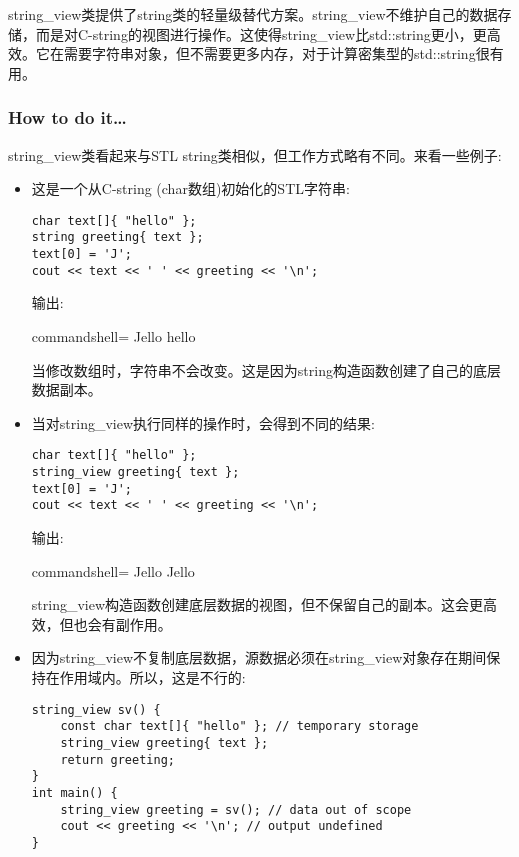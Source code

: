 
string\_view类提供了string类的轻量级替代方案。string\_view不维护自己的数据存储，而是对C-string的视图进行操作。这使得string\_view比std::string更小，更高效。它在需要字符串对象，但不需要更多内存，对于计算密集型的std::string很有用。

\subsubsection{How to do it…}

string\_view类看起来与STL string类相似，但工作方式略有不同。来看一些例子:

\begin{itemize}
\item 
这是一个从C-string (char数组)初始化的STL字符串:

\begin{lstlisting}[style=styleCXX]
char text[]{ "hello" };
string greeting{ text };
text[0] = 'J';
cout << text << ' ' << greeting << '\n';
\end{lstlisting}

输出:

\begin{tcblisting}{commandshell={}}
Jello hello
\end{tcblisting}

当修改数组时，字符串不会改变。这是因为string构造函数创建了自己的底层数据副本。

\item 
当对string\_view执行同样的操作时，会得到不同的结果:

\begin{lstlisting}[style=styleCXX]
char text[]{ "hello" };
string_view greeting{ text };
text[0] = 'J';
cout << text << ' ' << greeting << '\n';
\end{lstlisting}

输出:

\begin{tcblisting}{commandshell={}}
Jello Jello
\end{tcblisting}

string\_view构造函数创建底层数据的视图，但不保留自己的副本。这会更高效，但也会有副作用。

\item 
因为string\_view不复制底层数据，源数据必须在string\_view对象存在期间保持在作用域内。所以，这是不行的:

\begin{lstlisting}[style=styleCXX]
string_view sv() {
	const char text[]{ "hello" }; // temporary storage
	string_view greeting{ text };
	return greeting;
}
int main() {
	string_view greeting = sv(); // data out of scope
	cout << greeting << '\n'; // output undefined
}
\end{lstlisting}


\end{itemize}
